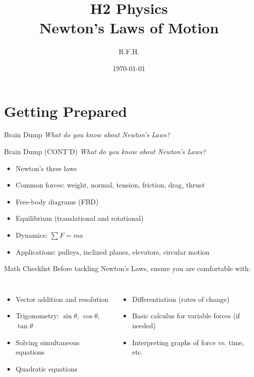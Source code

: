 \documentclass[11pt]{beamer}
\title{H2 Physics \\ Newton's Laws of Motion}
\author{R.F.H.}
\date{\today}
\begin{document}
\begin{frame}
\titlepage
\end{frame}

\section{Getting Prepared}

\begin{frame}[shrink=15]{Brain Dump}
\centering
\Large
\textit{What do you know about Newton's Laws?}
\vfill
\end{frame}

\begin{frame}[shrink=15]{Brain Dump (CONT'D)}
\centering
\Large
\textit{What do you know about Newton's Laws?}
\vfill
\begin{itemize}
    \item Newton's three laws
    \item Common forces: weight, normal, tension, friction, drag, thrust
    \item Free-body diagrams (FBD)
    \item Equilibrium (translational and rotational)
    \item Dynamics: $\sum F = ma$
    \item Applications: pulleys, inclined planes, elevators, circular motion
\end{itemize}
\end{frame}

\begin{frame}{Math Checklist}
Before tackling Newton's Laws, ensure you are comfortable with:
\begin{columns}[T]
\begin{itemize}
    \item Vector addition and resolution
    \item Trigonometry: $\sin\theta$, $\cos\theta$, $\tan\theta$
    \item Solving simultaneous equations
    \item Quadratic equations
\end{itemize}
\begin{itemize}
    \item Differentiation (rates of change)
    \item Basic calculus for variable forces (if needed)
    \item Interpreting graphs of force vs. time, etc.
\end{itemize}
\end{columns}
\end{frame}
\end{document}
